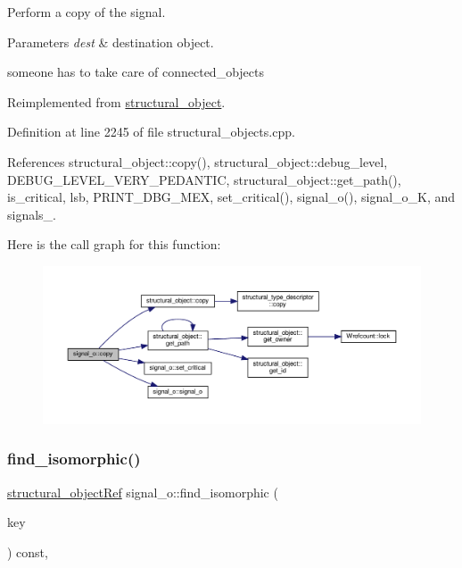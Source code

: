 Perform a copy of the signal. 


\begin{DoxyParams}{Parameters}
{\em dest} & destination object. \\
\hline
\end{DoxyParams}
someone has to take care of connected\+\_\+objects 

Reimplemented from \hyperlink{classstructural__object_a6566435c67934f6b4ff1b319c0682b18}{structural\+\_\+object}.



Definition at line 2245 of file structural\+\_\+objects.\+cpp.



References structural\+\_\+object\+::copy(), structural\+\_\+object\+::debug\+\_\+level, D\+E\+B\+U\+G\+\_\+\+L\+E\+V\+E\+L\+\_\+\+V\+E\+R\+Y\+\_\+\+P\+E\+D\+A\+N\+T\+IC, structural\+\_\+object\+::get\+\_\+path(), is\+\_\+critical, lsb, P\+R\+I\+N\+T\+\_\+\+D\+B\+G\+\_\+\+M\+EX, set\+\_\+critical(), signal\+\_\+o(), signal\+\_\+o\+\_\+K, and signals\+\_\+.

Here is the call graph for this function\+:
\nopagebreak
\begin{figure}[H]
\begin{center}
\leavevmode
\includegraphics[width=350pt]{db/d5c/classsignal__o_a9d35d1b08d9dd1f0945f9481e88d5a5b_cgraph}
\end{center}
\end{figure}
\mbox{\label{classsignal__o_a3c49fe1a0774acfff45b3a899a852a36}} 
\subsubsection{\texorpdfstring{find\+\_\+isomorphic()}{find\_isomorphic()}}
{\footnotesize\ttfamily \hyperlink{structural__objects_8hpp_a8ea5f8cc50ab8f4c31e2751074ff60b2}{structural\+\_\+object\+Ref} signal\+\_\+o\+::find\+\_\+isomorphic (\begin{DoxyParamCaption}\item[{const \hyperlink{structural__objects_8hpp_a8ea5f8cc50ab8f4c31e2751074ff60b2}{structural\+\_\+object\+Ref}}]{key }\end{DoxyParamCaption}) const\hspace{0.3cm}{\ttfamily [override]}, {\ttfamily [virtual]}}



